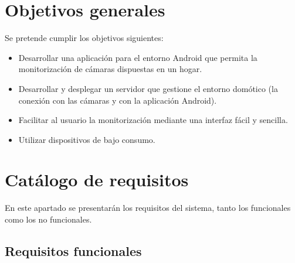 \section{Objetivos generales}

Se pretende cumplir los objetivos siguientes:

\begin{itemize}
\tightlist
\item
  Desarrollar una aplicación para el entorno Android que permita la monitorización de cámaras dispuestas en un hogar.
\item
  Desarrollar y desplegar un servidor que gestione el entorno domótico (la conexión con las cámaras y con la aplicación Android).
\item
  Facilitar al usuario la monitorización mediante una interfaz fácil y sencilla.
\item
  Utilizar dispositivos de bajo consumo.
\end{itemize}



\section{Catálogo de requisitos}

En este apartado se presentarán los requisitos del sistema, tanto los funcionales como los no funcionales.

\subsection{Requisitos funcionales}

